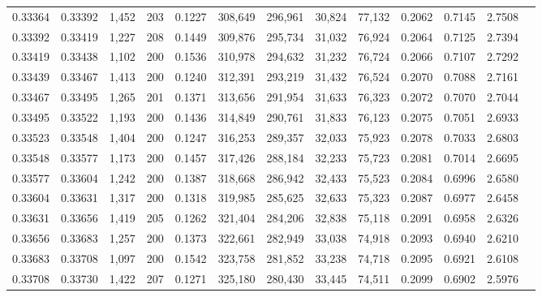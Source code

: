 \begin{tabular}{rrrrrrrrrrrrr}
0.33364 & 0.33392 & 1,452 & 203 &                                     0.1227 & 308,649 & 296,961 &  30,824 &  77,132 & 0.2062 & 0.7145 & 2.7508 \\
0.33392 & 0.33419 & 1,227 & 208 &                                     0.1449 & 309,876 & 295,734 &  31,032 &  76,924 & 0.2064 & 0.7125 & 2.7394 \\
0.33419 & 0.33438 & 1,102 & 200 &                                     0.1536 & 310,978 & 294,632 &  31,232 &  76,724 & 0.2066 & 0.7107 & 2.7292 \\
0.33439 & 0.33467 & 1,413 & 200 &                                     0.1240 & 312,391 & 293,219 &  31,432 &  76,524 & 0.2070 & 0.7088 & 2.7161 \\
0.33467 & 0.33495 & 1,265 & 201 &                                     0.1371 & 313,656 & 291,954 &  31,633 &  76,323 & 0.2072 & 0.7070 & 2.7044 \\
0.33495 & 0.33522 & 1,193 & 200 &                                     0.1436 & 314,849 & 290,761 &  31,833 &  76,123 & 0.2075 & 0.7051 & 2.6933 \\
0.33523 & 0.33548 & 1,404 & 200 &                                     0.1247 & 316,253 & 289,357 &  32,033 &  75,923 & 0.2078 & 0.7033 & 2.6803 \\
0.33548 & 0.33577 & 1,173 & 200 &                                     0.1457 & 317,426 & 288,184 &  32,233 &  75,723 & 0.2081 & 0.7014 & 2.6695 \\
0.33577 & 0.33604 & 1,242 & 200 &                                     0.1387 & 318,668 & 286,942 &  32,433 &  75,523 & 0.2084 & 0.6996 & 2.6580 \\
0.33604 & 0.33631 & 1,317 & 200 &                                     0.1318 & 319,985 & 285,625 &  32,633 &  75,323 & 0.2087 & 0.6977 & 2.6458 \\
0.33631 & 0.33656 & 1,419 & 205 &                                     0.1262 & 321,404 & 284,206 &  32,838 &  75,118 & 0.2091 & 0.6958 & 2.6326 \\
0.33656 & 0.33683 & 1,257 & 200 &                                     0.1373 & 322,661 & 282,949 &  33,038 &  74,918 & 0.2093 & 0.6940 & 2.6210 \\
0.33683 & 0.33708 & 1,097 & 200 &                                     0.1542 & 323,758 & 281,852 &  33,238 &  74,718 & 0.2095 & 0.6921 & 2.6108 \\
0.33708 & 0.33730 & 1,422 & 207 &                                     0.1271 & 325,180 & 280,430 &  33,445 &  74,511 & 0.2099 & 0.6902 & 2.5976 \\

\end{tabular}

